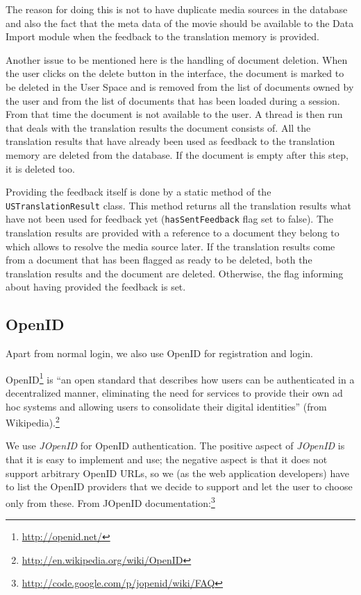 The reason for doing this is not to have duplicate media sources in the database and also the fact that the meta data of the movie should be available to the Data Import module when the feedback to the translation memory is provided.

Another issue to be mentioned here is the handling of document deletion. When the user clicks on the delete button in the interface, the document is marked to be deleted in the User Space and is removed from the list of documents owned by the user and from the list of documents that has been loaded during a session. From that time the document is not available to the user. A thread is then run that deals with the translation results the document consists of. All the translation results that have already been used as feedback to the translation memory are deleted from the database. If the document is empty after this step, it is deleted too.

Providing the feedback itself is done by a static method of the {\tt USTranslationResult} class. This method returns all the translation results what have not been used for feedback yet ({\tt hasSentFeedback} flag set to false). The translation results are provided with a reference to a document they belong to which allows to resolve the media source later. If the translation results come from a document that has been flagged as ready to be deleted, both the translation results and the document are deleted. Otherwise, the flag informing about having provided the feedback is set.

\subsection{OpenID}
\label{us:openid}
Apart from normal login, we also use OpenID for registration and login.

OpenID\footnote{\url{http://openid.net/}} is ``an open standard that describes how users can be authenticated in a decentralized manner, eliminating the need for services to provide their own ad hoc systems and allowing users to consolidate their digital identities'' (from Wikipedia).\footnote{\url{http://en.wikipedia.org/wiki/OpenID}}

We use \emph{JOpenID} for OpenID authentication. The positive aspect of \emph{JOpenID} is that it is easy to implement and use; the negative aspect is that it does not support arbitrary OpenID URLs, so we (as the web application developers) have to list the OpenID providers that we decide to support and let the user to choose only from these. From JOpenID documentation:\footnote{\url{http://code.google.com/p/jopenid/wiki/FAQ}}

